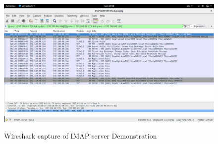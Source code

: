 \documentclass[11pt]{article}
\begin{document}
\begin{figure}[!htb]
\centering
\caption{Wireshark capture of IMAP server Demonstration}
\includegraphics[width=17cm]{images/IMAP_SERVER.png}
\label{IMAP_SERVER}
\end{figure}
\end{document}
